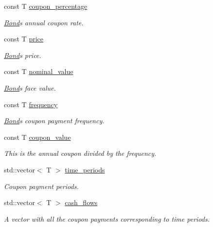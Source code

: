 \begin{DoxyCompactItemize}
\item 
const T \hyperlink{classbond_1_1_bond_add6662fd4f8ee756b83a3f818f8c7ada}{coupon\+\_\+percentage}
\begin{DoxyCompactList}\small\item\em \hyperlink{classbond_1_1_bond}{Bond}\textquotesingle{}s annual coupon rate. \end{DoxyCompactList}\item 
const T \hyperlink{classbond_1_1_bond_afcabe8593aba44ca9740d14f85a39f2a}{price}
\begin{DoxyCompactList}\small\item\em \hyperlink{classbond_1_1_bond}{Bond}\textquotesingle{}s price. \end{DoxyCompactList}\item 
const T \hyperlink{classbond_1_1_bond_a7a79ca13c060697765f13140eb471b84}{nominal\+\_\+value}
\begin{DoxyCompactList}\small\item\em \hyperlink{classbond_1_1_bond}{Bond}\textquotesingle{}s face value. \end{DoxyCompactList}\item 
const T \hyperlink{classbond_1_1_bond_ad1871f40122a63fb0b2ebbdcdd12c1cd}{frequency}
\begin{DoxyCompactList}\small\item\em \hyperlink{classbond_1_1_bond}{Bond}\textquotesingle{}s coupon payment frequency. \end{DoxyCompactList}\item 
const T \hyperlink{classbond_1_1_bond_aae68bdfac23a0530b3723cca3100e92e}{coupon\+\_\+value}
\begin{DoxyCompactList}\small\item\em This is the annual coupon divided by the frequency. \end{DoxyCompactList}\item 
std\+::vector$<$ T $>$ \hyperlink{classbond_1_1_bond_ac3db034ebeff1f6cd2ed7061fda27fad}{time\+\_\+periods}
\begin{DoxyCompactList}\small\item\em Coupon payment periods. \end{DoxyCompactList}\item 
std\+::vector$<$ T $>$ \hyperlink{classbond_1_1_bond_ae98011d18cd97942b45f5868a42bf668}{cash\+\_\+flows}
\begin{DoxyCompactList}\small\item\em A vector with all the coupon payments corresponding to time periods. \end{DoxyCompactList}\item 

\end{DoxyCompactItemize}
